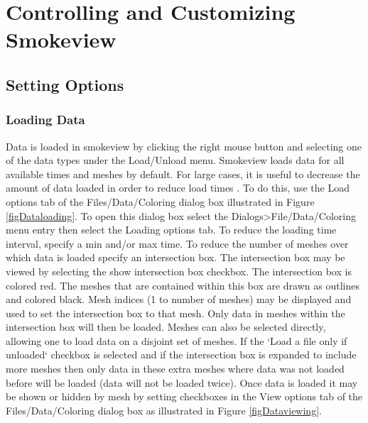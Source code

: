 \documentclass[11pt,twoside]{book}
\begin{document}

\part{Controlling and Customizing Smokeview}

\chapter{Setting Options}
\label{chapter:settingoptions}
\section{Loading Data}

Data is loaded in smokeview by clicking the right mouse button and selecting one of the data types
under the Load/Unload menu. Smokeview loads data for all available times and meshes by default.
For large cases, it is useful to decrease the amount of data loaded in order to reduce load times .
To do this, use the Load options tab of the Files/Data/Coloring dialog box
illustrated in Figure \ref{figDataloading}.
To open this dialog box select the Dialogs>File/Data/Coloring menu entry then select the Loading options tab.
To reduce the loading time interval, specify a min and/or max time.
To reduce the number of meshes over which
data is loaded specify an intersection box.
The intersection box may be viewed by selecting the show intersection box checkbox.
The intersection box is colored red. The meshes that are contained within this box
are drawn as outlines and colored black. Mesh indices (1 to number of meshes) may be displayed and used
to set the intersection box to that mesh.
Only data in meshes within the intersection box will
then be loaded. Meshes can also be selected directly, allowing one to load data on a disjoint set of meshes.
If the `Load a file only if unloaded` checkbox is selected and if the intersection box
is expanded to include more meshes then only data in these extra meshes where data was not loaded before will be loaded
(data will not be loaded twice).
Once data is loaded it may be shown or hidden by mesh by setting checkboxes in the View options tab of the Files/Data/Coloring dialog box as illustrated in Figure \ref{figDataviewing}.
\end{document}
